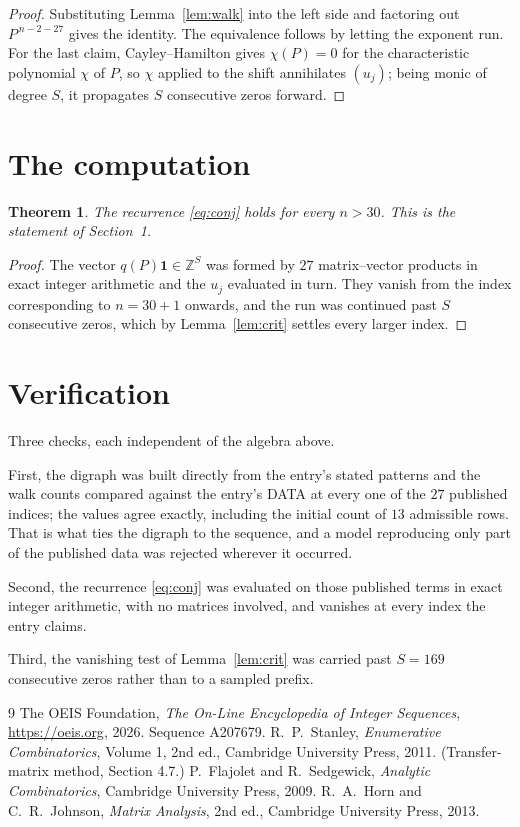 \documentclass[11pt,a4paper]{article}
\theoremstyle{plain}
\newtheorem{theorem}{Theorem}
\theoremstyle{definition}
\begin{document}
\begin{proof}
Substituting Lemma~\ref{lem:walk} into the left side and factoring out
$P^{\,n-2-27}$ gives the identity. The equivalence follows by letting the exponent
run. For the last claim, Cayley--Hamilton gives $\chi(P)=0$ for the characteristic
polynomial $\chi$ of $P$, so $\chi$ applied to the shift annihilates $(u_j)$; being monic of
degree $S$, it propagates $S$ consecutive zeros forward.
\end{proof}

\section{The computation}

\begin{theorem}
The recurrence \eqref{eq:conj} holds for every $n>30$. This is the statement of
Section~1.
\end{theorem}

\begin{proof}
The vector $q(P)\mathbf{1}\in\mathbb{Z}^{S}$ was formed by $27$ matrix--vector
products in exact integer arithmetic and the $u_j$ evaluated in turn. They vanish from the
index corresponding to $n=30+1$ onwards, and the run was continued past $S$ consecutive
zeros, which by Lemma~\ref{lem:crit} settles every larger index.
\end{proof}

\section{Verification}

Three checks, each independent of the algebra above.

First, the digraph was built directly from the entry's stated patterns and the walk counts
compared against the entry's DATA at every one of the $27$ published indices; the
values agree exactly, including the initial count of $13$ admissible rows. That is
what ties the digraph to the sequence, and a model reproducing only part of the published
data was rejected wherever it occurred.

Second, the recurrence \eqref{eq:conj} was evaluated on those published terms in exact
integer arithmetic, with no matrices involved, and vanishes at every index the entry claims.

Third, the vanishing test of Lemma~\ref{lem:crit} was carried past $S=169$ consecutive
zeros rather than to a sampled prefix.

\begin{thebibliography}{9}
 The OEIS Foundation, \emph{The On-Line Encyclopedia of Integer
Sequences}, \url{https://oeis.org}, 2026. Sequence A207679.
 R.~P.~Stanley, \emph{Enumerative Combinatorics}, Volume 1, 2nd ed.,
Cambridge University Press, 2011. (Transfer-matrix method, Section 4.7.)
 P.~Flajolet and R.~Sedgewick, \emph{Analytic Combinatorics}, Cambridge
University Press, 2009.
 R.~A.~Horn and C.~R.~Johnson, \emph{Matrix Analysis}, 2nd ed., Cambridge
University Press, 2013.
\end{thebibliography}
\end{document}
